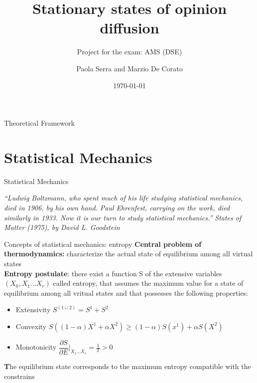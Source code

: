 \documentclass{beamer}
\title[AMS project]{ Stationary states of opinion diffusion}
\subtitle{Project for the exam: AMS (DSE)}
\author{Paola Serra and Marzio De Corato }
\date{\today}
\begin{document}
\begin{frame}
\vspace{+4 cm}  \titlepage
\end{frame}

\usebackgroundtemplate{ } 






\begin{frame}{}
\begin{center}
{\Huge Theoretical Framework}
\end{center}
\end{frame}


\section{Statistical Mechanics}

\begin{frame}{}
\begin{center}
{\Huge Statistical Mechanics}
\end{center}
\begin{center}
\textit{“Ludwig Boltzmann, who spent much of his life studying statistical mechanics, died in 1906, by his own hand. Paul Ehrenfest, carrying on the work, died similarly in 1933. Now it is our turn to study statistical mechanics.” States of Matter (1975), by David L. Goodstein}
\end{center}
\end{frame}

\begin{frame}{Concepts of statistical mechanics: entropy \cite{peliti2011statistical}}
\textbf{Central problem of thermodynamics:} characterize the actual state of equilibrium among all virtual states  \\
\textbf{Entropy postulate}: there exist a function S of the extensive variables $(X_{0},X_{1}...X_{r})$ called entropy,  that assumes the maximum value for a state of equilibrium among all vritual states and that possesses the following properties:
\begin{itemize}
\item Extensivity $S^{(1\cup2)}=S^{1}+S^{2}$
\item Convexity $S((1-\alpha)X^{1}+\alpha X^{2}) \geq (1-\alpha)S(x^{1})+\alpha S(X^{2})$
\item Monotonicity $\dfrac{\partial S}{\partial E}|_{X_{1}...X_{r}}=\frac{1}{T}>0$
\end{itemize}
\textbf The equilibrium state corresponds to the maximum entropy compatible with the constrains

\end{frame}
\end{document}

